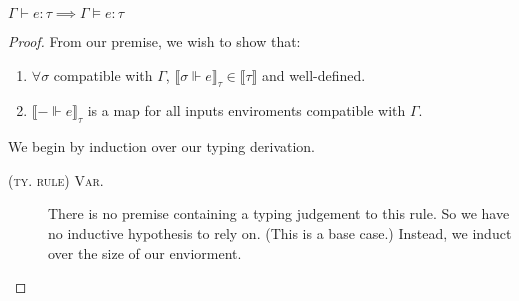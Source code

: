 \begin{theorem}
$\Gamma \vdash e : \tau \implies \Gamma \vDash e : \tau$
\end{theorem}
\begin{proof}
From our premise, we wish to show that:
  \begin{enumerate}
    \item $\forall \sigma$ compatible with $\Gamma$, $\llbracket \sigma \Vdash e
      \rrbracket_{\tau} \in \llbracket \tau \rrbracket$ and well-defined.
    \item $\llbracket - \Vdash e \rrbracket_{\tau}$ is a  map
      for all inputs enviroments compatible with $\Gamma$.
  \end{enumerate}
We begin by induction over our typing derivation. 
\begin{description}
  \item[\textsc{(ty. rule) Var.}] There is no premise containing a typing
    judgement to this rule. So we have no inductive hypothesis to rely on.
    (This is a base case.)
    Instead, we induct over the size of our enviorment.
\end{description}
\end{proof}
